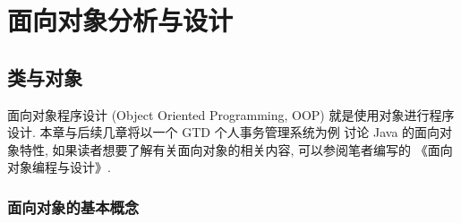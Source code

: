 \documentclass[10pt,UTF8]{book} %
\begin{document}



% 







\newpage
\thispagestyle{empty}

\pagestyle{plain}
{\tableofcontents}
\newpage
\thispagestyle{empty}
\cleardoublepage %


\makeatletter
\let\ps@plain\ps@empty
\makeatother

\mainmatter

\part{面向对象分析与设计}

\chapter{类与对象}

面向对象程序设计 (Object Oriented Programming, OOP)
就是使用对象进行程序设计. 本章与后续几章将以一个 GTD 个人事务管理系统为例
讨论 Java 的面向对象特性,
如果读者想要了解有关面向对象的相关内容, 可以参阅笔者编写的
《面向对象编程与设计》.

\section{面向对象的基本概念}
\end{document}
